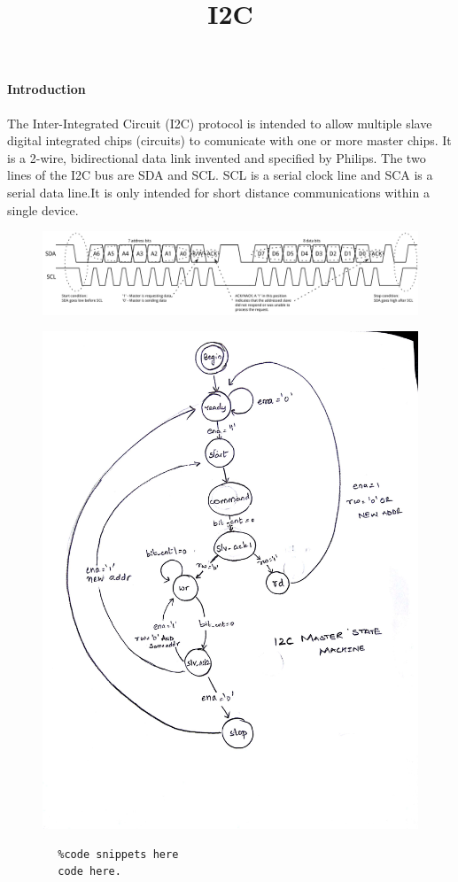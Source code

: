 \documentclass[journal,12pt,twocolumn]{IEEEtran}
\title{I2C}
\begin{document}
	\maketitle

	\paragraph{Introduction}
		The Inter-Integrated Circuit (I2C) protocol is intended to allow multiple slave digital integrated chips (circuits) to comunicate with one or more master chips. It is a 2-wire, bidirectional data link invented and specified by Philips. The two lines of the I2C bus are SDA and SCL. SCL is a serial clock line and SCA is a serial data line.\newline		 It is only intended for short distance communications within a single device.

		
		
	\begin{figure}[h!] %
		\includegraphics[width=\linnewidth]{i2c_concept.png}
		\label{fig: I2C protocol}
	\end{figure}

	\begin{figure}[p] %
		\includegraphics[width=\linewidth]{i2c_state_diagram.JPG}
	\end{figure}


	\begin{lstlisting}
		%code snippets here
		code here. 
	\end{lstlisting}
\end{document}
